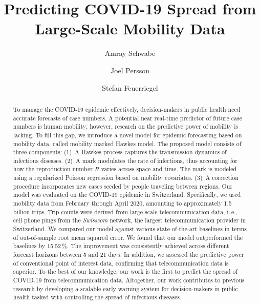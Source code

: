 \documentclass[sigconf, review = false, nonacm = true]{acmart}
\newcommand\ie{i.\,e.\xspace}
\begin{document}
\title{Predicting COVID-19 Spread from Large-Scale Mobility Data}

\author{Amray Schwabe}

\author{Joel Persson}

\author{Stefan Feuerriegel}

\begin{abstract}
To manage the COVID-19 epidemic effectively, decision-makers in public health need accurate forecasts of case numbers. A potential near real-time predictor of future case numbers is human mobility; however, research on the predictive power of mobility is lacking. To fill this gap, we introduce a novel model for epidemic forecasting based on mobility data, called mobility marked Hawkes model. The proposed model consists of three components: (1)~A Hawkes process captures the transmission dynamics of infectious diseases. (2)~A mark modulates the rate of infections, thus accounting for how the reproduction number $R$ varies across space and time. The mark is modeled using a regularized Poisson regression based on mobility covariates. (3)~A correction procedure incorporates new cases seeded by people traveling between regions. Our model was evaluated on the COVID-19 epidemic in Switzerland. Specifically, we used mobility data from February through April 2020, amounting to approximately 1.5 billion trips. Trip counts were derived from large-scale telecommunication data, \ie, cell phone pings from the \emph{Swisscom} network, the largest telecommunication provider in Switzerland. We compared our model against various state-of-the-art baselines in terms of out-of-sample root mean squared error. We found that our model outperformed the baselines by 15.52\,\%. The improvement was consistently achieved across different forecast horizons between 5 and 21 days. In addition, we assessed the predictive power of conventional point of interest data, confirming that telecommunication data is superior. To the best of our knowledge, our work is the first to predict the spread of COVID-19 from telecommunication data. Altogether, our work contributes to previous research by developing a scalable early warning system for decision-makers in public health tasked with controlling the spread of infectious diseases.
\end{abstract}
\end{document}
